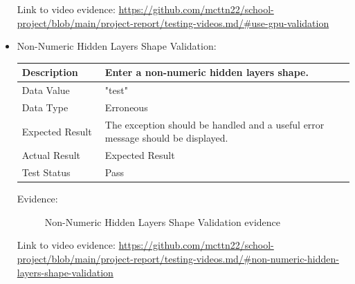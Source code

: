 \documentclass[./project-report/src/latex/project-report.tex]{subfiles}
\begin{document}
\begin{itemize}
		Link to video evidence: \url{https://github.com/mcttn22/school-project/blob/main/project-report/testing-videos.md/#use-gpu-validation}

	\pagebreak

	\item Non-Numeric Hidden Layers Shape Validation: \newline\newline
		\begin{tabular}{|p{0.25\linewidth}|p{0.75\linewidth}|}
			\hline
			Description & Enter a non-numeric hidden layers shape. \\
			\hline
			Data Value & "test" \\
			\hline
			Data Type & Erroneous \\
			\hline
			Expected Result & The exception should be handled and a useful error message should be displayed. \\
			\hline
			Actual Result & Expected Result \\
			\hline
			Test Status & Pass \\
			\hline
		\end{tabular}

		\vspace{5mm}

		Evidence:
		\begin{figure}[h!]
		\centering
		\caption{Non-Numeric Hidden Layers Shape Validation evidence}
		\end{figure}

		\begin{sloppypar}
		Link to video evidence: \url{https://github.com/mcttn22/school-project/blob/main/project-report/testing-videos.md/#non-numeric-hidden-layers-shape-validation}
		\end{sloppypar}


\end{itemize}
\end{document}
